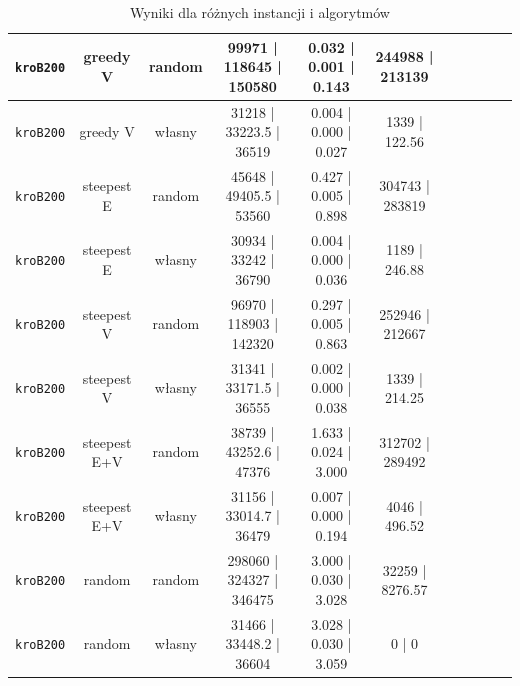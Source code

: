 \documentclass[11pt]{article}
\begin{document}
\begin{table}[ht]
\begin{tabular}{|c|c|c||c|c|c||c|c|c||c|c|}
\texttt{kroB200} & greedy V & random & 99971 | 118645 | 150580 & 0.032 | 0.001 | 0.143 & 244988 | 213139 \\ \hline
\texttt{kroB200} & greedy V & własny & 31218 | 33223.5 | 36519 & 0.004 | 0.000 | 0.027 & 1339 | 122.56 \\ \hline
\texttt{kroB200} & steepest E & random & 45648 | 49405.5 | 53560 & 0.427 | 0.005 | 0.898 & 304743 | 283819 \\ \hline
\texttt{kroB200} & steepest E & własny & 30934 | 33242 | 36790 & 0.004 | 0.000 | 0.036 & 1189 | 246.88 \\ \hline
\texttt{kroB200} & steepest V & random & 96970 | 118903 | 142320 & 0.297 | 0.005 | 0.863 & 252946 | 212667 \\ \hline
\texttt{kroB200} & steepest V & własny & 31341 | 33171.5 | 36555 & 0.002 | 0.000 | 0.038 & 1339 | 214.25 \\ \hline
\texttt{kroB200} & steepest E+V & random & 38739 | 43252.6 | 47376 & 1.633 | 0.024 | 3.000 & 312702 | 289492 \\ \hline
\texttt{kroB200} & steepest E+V & własny & 31156 | 33014.7 | 36479 & 0.007 | 0.000 | 0.194 & 4046 | 496.52 \\ \hline
\texttt{kroB200} & random & random & 298060 | 324327 | 346475 & 3.000 | 0.030 | 3.028 & 32259 | 8276.57 \\ \hline
\texttt{kroB200} & random & własny & 31466 | 33448.2 | 36604 & 3.028 | 0.030 | 3.059 & 0 | 0 \\ \hline
\end{tabular}
\caption{Wyniki dla różnych instancji i algorytmów}
\end{table}
\end{document}
